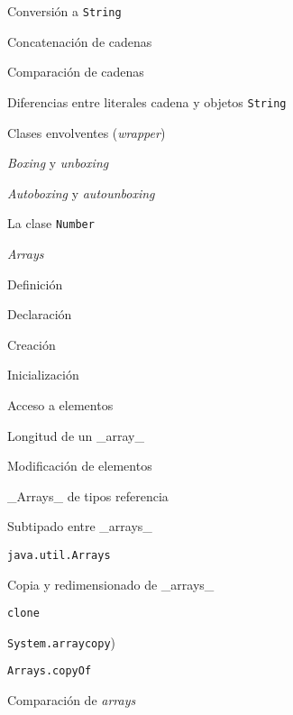\begin{longenum}
\begin{longenum}
\begin{longenum}
\begin{longenum}
\begin{longenum}
                \end{longenum}
                \item Conversión a \texttt{String}
                \item Concatenación de cadenas
                \item Comparación de cadenas
                \item Diferencias entre literales cadena y objetos \texttt{String}
            \end{longenum}
            \item Clases envolventes (\textit{wrapper})
            \begin{longenum}
                \item \textit{Boxing} y \textit{unboxing}
                \item \textit{Autoboxing} y \textit{autounboxing}
                \item La clase \texttt{Number}
            \end{longenum}
        \end{longenum}
        \item \textit{Arrays}
        \begin{longenum}
            \item Definición
            \item Declaración
            \item Creación
            \item Inicialización
            \item Acceso a elementos
            \item Longitud de un \_array\_
            \item Modificación de elementos
            \item \_Arrays\_ de tipos referencia
            \item Subtipado entre \_arrays\_
            \item \texttt{java.util.Arrays}
            \item Copia y redimensionado de \_arrays\_
            \begin{longenum}
                \item \texttt{clone}
                \item \texttt{System.arraycopy})
                \item \texttt{Arrays.copyOf}
            \end{longenum}
            \item Comparación de \textit{arrays}
            \begin{longenum}

\end{longenum}
\end{longenum}
\end{longenum}
\end{longenum}
